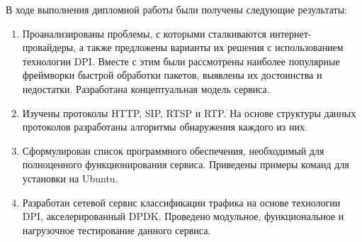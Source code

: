 \Conclusion
В ходе выполнения дипломной работы были получены следующие результаты:
\begin{enumerate}[1.]
\item Проанализированы проблемы, с которыми сталкиваются интернет-провайдеры, а также предложены варианты их решения с использованием технологии DPI. Вместе с этим были рассмотрены наиболее популярные фреймворки быстрой обработки пакетов, выявлены их достоинства и недостатки. Разработана концептуальная модель сервиса.
\item Изучены протоколы HTTP, SIP, RTSP и RTP. На основе структуры данных протоколов разработаны алгоритмы обнаружения каждого из них.
\item Сформулирован список программного обеспечения, необходимый для полноценного функционирования сервиса. Приведены примеры команд для установки на Ubuntu.
\item Разработан сетевой сервис классификации трафика на основе технологии DPI, акселерированный DPDK. Проведено модульное, функциональное и нагрузочное тестирование данного сервиса.
\end{enumerate}

